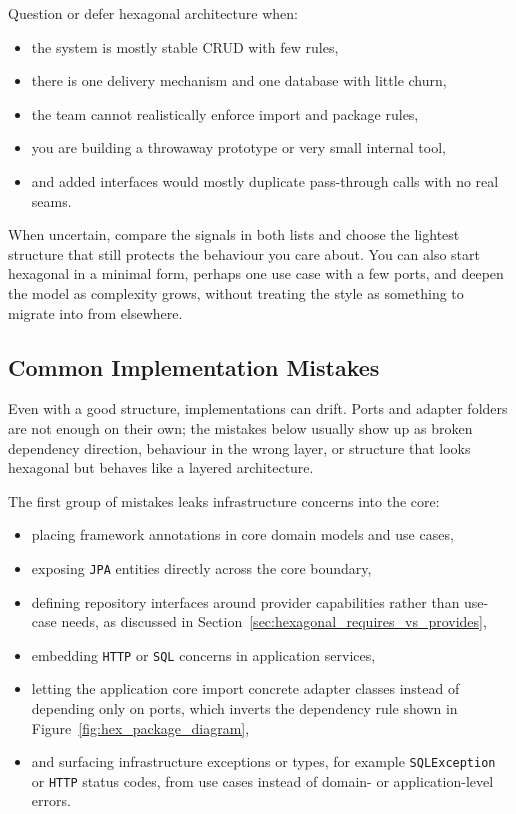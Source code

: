 Question or defer hexagonal architecture when:
\begin{itemize}
    \item the system is mostly stable CRUD with few rules,
    \item there is one delivery mechanism and one database with little churn,
    \item the team cannot realistically enforce import and package rules,
    \item you are building a throwaway prototype or very small internal tool,
    \item and added interfaces would mostly duplicate pass-through calls with no real seams.
\end{itemize}

When uncertain, compare the signals in both lists and choose the lightest structure that still protects the behaviour you care about. You can also start hexagonal in a minimal form, perhaps one use case with a few ports, and deepen the model as complexity grows, without treating the style as something to migrate into from elsewhere.

\subsection{Common Implementation Mistakes}
\label{sec:hexagonal_common_mistakes}

Even with a good structure, implementations can drift. Ports and adapter folders are not enough on their own; the mistakes below usually show up as broken dependency direction, behaviour in the wrong layer, or structure that looks hexagonal but behaves like a layered architecture.

The first group of mistakes leaks infrastructure concerns into the core:
\begin{itemize}
    \item placing framework annotations in core domain models and use cases,
    \item exposing \texttt{JPA} entities directly across the core boundary,
    \item defining repository interfaces around provider capabilities rather than use-case needs, as discussed in Section~\ref{sec:hexagonal_requires_vs_provides},
    \item embedding \texttt{HTTP} or \texttt{SQL} concerns in application services,
    \item letting the application core import concrete adapter classes instead of depending only on ports, which inverts the dependency rule shown in Figure~\ref{fig:hex_package_diagram},
    \item and surfacing infrastructure exceptions or types, for example \texttt{SQLException} or \texttt{HTTP} status codes, from use cases instead of domain- or application-level errors.
\end{itemize}


